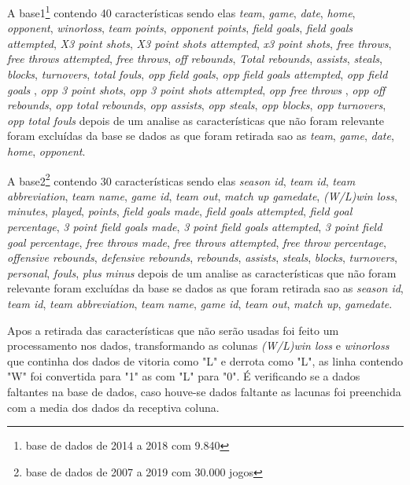 A base1\footnote{base de dados de 2014 a 2018 com 9.840} contendo 40 características sendo elas \textit{team}, \textit{game}, \textit{date}, \textit{home}, \textit{opponent}, \textit{winorloss}, \textit{team points}, \textit{opponent points}, \textit{field goals}, \textit{field goals attempted}, \textit{X3 point shots}, \textit{X3 point shots attempted},   \textit{x3 point shots}, \textit{free throws}, \textit{free throws attempted}, \textit{free throws}, \textit{off rebounds}, \textit{Total rebounds}, \textit{assists}, \textit{steals}, \textit{blocks}, \textit{turnovers}, \textit{total fouls}, \textit{opp field goals}, \textit{opp field goals attempted}, \textit{opp field goals }, \textit{opp 3 point shots}, \textit{opp 3 point shots attempted}, \textit{opp free throws }, \textit{opp off rebounds}, \textit{opp total rebounds}, \textit{opp assists}, \textit{opp steals}, \textit{opp blocks}, \textit{opp turnovers}, \textit{opp total fouls} depois de um analise as características que não foram relevante foram excluídas da base se dados as que foram retirada sao as \textit{team}, \textit{game}, \textit{date}, \textit{home}, \textit{opponent}.

A base2\footnote{base de dados de 2007 a 2019 com 30.000 jogos} contendo 30 características sendo elas \textit{season id},  \textit{team id}, \textit{team abbreviation}, \textit{team name}, \textit{game id}, \textit{team out}, \textit{match up}	\textit{gamedate}, \textit{(W/L)win loss}, \textit{minutes}, \textit{played}, \textit{points}, \textit{field goals made},  \textit{field goals attempted}, \textit{field goal percentage}, \textit{3 point field goals made}, \textit{3 point field goals attempted}, \textit{3 point field goal percentage}, \textit{free throws made}, \textit{free throws attempted},  \textit{free throw percentage}, \textit{offensive rebounds}, \textit{defensive rebounds}, \textit{rebounds},  \textit{assists}, \textit{steals}, \textit{blocks}, \textit{turnovers}, \textit{personal}, \textit{fouls}, \textit{plus minus} depois de um analise as características que não foram relevante foram excluídas da base se dados as que foram retirada sao as \textit{season id}, \textit{team id}, \textit{team abbreviation}, \textit{team name}, \textit{game id}, \textit{team out}, \textit{match up}, \textit{gamedate}.

Apos a retirada das características que não serão usadas foi feito um processamento nos dados, transformando as colunas \textit{(W/L)win loss} e \textit{winorloss} que continha dos dados de vitoria como "L" e derrota como "L", as linha contendo "W" foi convertida para "1" as com "L" para "0". É verificando se a dados faltantes na base de dados, caso houve-se dados faltante  as lacunas foi preenchida com a media dos dados da receptiva coluna.

